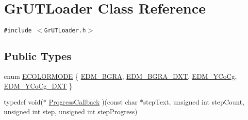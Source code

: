 \hypertarget{class_gr_u_t_loader}{
\section{GrUTLoader Class Reference}
\label{class_gr_u_t_loader}
}
{\tt \#include $<$GrUTLoader.h$>$}

\subsection*{Public Types}
\begin{CompactItemize}
\item 
enum \hyperlink{class_gr_u_t_loader_328b8875d7cc411c1ad47f0d9279d8f2}{ECOLORMODE} \{ \hyperlink{class_gr_u_t_loader_328b8875d7cc411c1ad47f0d9279d8f29ec4865a1ef98ef310b97499681bbdc9}{EDM\_\-BGRA}, 
\hyperlink{class_gr_u_t_loader_328b8875d7cc411c1ad47f0d9279d8f2b0937d274d38a74ec18365d251e853d2}{EDM\_\-BGRA\_\-DXT}, 
\hyperlink{class_gr_u_t_loader_328b8875d7cc411c1ad47f0d9279d8f256ee2c13f924e5f97453e60e1c53fac2}{EDM\_\-YCoCg}, 
\hyperlink{class_gr_u_t_loader_328b8875d7cc411c1ad47f0d9279d8f2965295944f1e1f65bb7ddce0508c4567}{EDM\_\-YCoCg\_\-DXT}
 \}
\item 
typedef void($\ast$ \hyperlink{class_gr_u_t_loader_b2a7be2e554d43ef1a6b4851ef4e0f39}{ProgressCallback} )(const char $\ast$stepText, unsigned int stepCount, unsigned int step, unsigned int stepProgress)

\end{CompactItemize}

